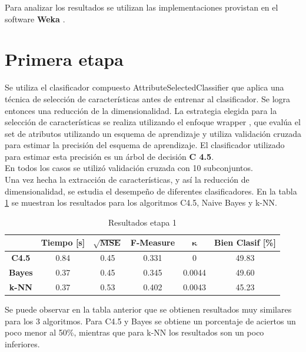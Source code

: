 \documentclass[12pt,a4paper,titlepage]{report}
\newcommand{\bs}{\boldsymbol}
\begin{document}
Para analizar los resultados se utilizan las implementaciones provistan en el software \textbf{Weka} \cite{bib:weka}.

\section{Primera etapa}
Se utiliza el clasificador compuesto AttributeSelectedClassifier  que aplica una técnica de selección de características antes de entrenar al clasificador. Se logra entonces una reducción de la dimensionalidad. La estrategia elegida para la selección de características se realiza utilizando el enfoque wrapper , que evalúa el set de atributos utilizando un esquema de aprendizaje y utiliza validación cruzada para estimar la precisión del esquema de aprendizaje. El clasificador utilizado para estimar esta precisión es un árbol de decisión \textbf{C 4.5}.\\

En todos los casos se utilizó validación cruzada con 10 subconjuntos.\\

Una vez hecha la extracción de características, y así la reducción de dimensionalidad, se estudia el desempeño de diferentes clasificadores. En la tabla \ref{tab:resultados_etapa1} se muestran los resultados para los algoritmos C4.5, Naive Bayes y k-NN.
\begin{table}[H]
\centering
	\begin{tabular}{c|c|c|c|c|c|} 
	\cline{2-6}
	& \multicolumn{1}{c|}{\cellcolor[gray]{0.7} \textbf{Tiempo [s]}}  
	& \multicolumn{1}{c|}{\cellcolor[gray]{0.7} $\mathbf{\sqrt{MSE}}$}
	& \multicolumn{1}{c|}{\cellcolor[gray]{0.7} \textbf{F-Measure}}
	& \multicolumn{1}{c|}{\cellcolor[gray]{0.7} $\bs\kappa$}
	& \multicolumn{1}{c|}{\cellcolor[gray]{0.7} \textbf{Bien Clasif [\%]}} \\ \hline
	
	\multicolumn{1}{|c|}{\cellcolor[gray]{0.8} \textbf{C4.5}}   & 0.84 & 0.45 & 0.331 & 0 & \cellcolor[gray]{0.9}49.83  \\ \hline
	\multicolumn{1}{|c|}{\cellcolor[gray]{0.8} \textbf{Bayes}}  & 0.37 & 0.45 & 0.345 & 0.0044 & \cellcolor[gray]{0.9}49.60 \\ \hline
	\multicolumn{1}{|c|}{\cellcolor[gray]{0.8} \textbf{k-NN}}   & 0.37 & 0.53 & 0.402 & 0.0043 & \cellcolor[gray]{0.9}45.23 \\ \hline
	\end{tabular} 
	\caption{Resultados etapa 1}
	\label{tab:resultados_etapa1}
\end{table}
Se puede observar en la tabla anterior que se obtienen resultados muy similares para los 3 algoritmos. Para C4.5 y Bayes se obtiene un porcentaje de aciertos un poco menor al 50\%, mientras que para k-NN los resultados son un poco inferiores. \\
\end{document}
